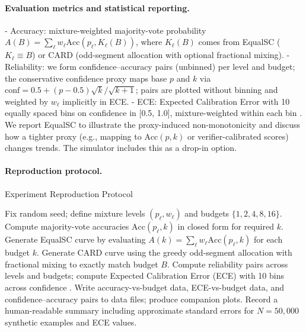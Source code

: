 \documentclass[11pt]{article}
\begin{document}
\paragraph{Evaluation metrics and statistical reporting.}
- Accuracy: mixture-weighted majority-vote probability $A(B)=\sum_\ell w_\ell \mathrm{Acc}(p_\ell, K_\ell(B))$, where $K_\ell(B)$ comes from EqualSC ($K_\ell\equiv B$) or CARD (odd-segment allocation with optional fractional mixing).
- Reliability: we form confidence–accuracy pairs (unbinned) per level and budget; the conservative confidence proxy maps base $p$ and $k$ via $\text{conf}=0.5+(p-0.5)\sqrt{k}/\sqrt{k+1}$; pairs are plotted without binning and weighted by $w_\ell$ implicitly in ECE.
- ECE: Expected Calibration Error with 10 equally spaced bins on confidence in [0.5, 1.0], mixture-weighted within each bin \citep{Guo2017Calibration}. We report EqualSC to illustrate the proxy-induced non-monotonicity and discuss how a tighter proxy (e.g., mapping to $\mathrm{Acc}(p,k)$ or verifier-calibrated scores) changes trends. The simulator includes this as a drop-in option.

\resultsTable
\reliabilityTable
\eceTable

\paragraph{Reproduction protocol.}
\begin{algorithm}[h]
\caption{Experiment Reproduction Protocol}
\begin{algorithmic}[1]
\STATE Fix random seed; define mixture levels $(p_\ell,w_\ell)$ and budgets $\{1,2,4,8,16\}$.
\STATE Compute majority-vote accuracies $\mathrm{Acc}(p_\ell,k)$ in closed form for required $k$.
\STATE Generate EqualSC curve by evaluating $A(k)=\sum_\ell w_\ell \mathrm{Acc}(p_\ell,k)$ for each budget $k$.
\STATE Generate CARD curve using the greedy odd-segment allocation with fractional mixing to exactly match budget $B$.
\STATE Compute reliability pairs across levels and budgets; compute Expected Calibration Error (ECE) with 10 bins across confidence \citep{Guo2017Calibration}.
\STATE Write accuracy-vs-budget data, ECE-vs-budget data, and confidence–accuracy pairs to data files; produce companion plots.
\STATE Record a human-readable summary including approximate standard errors for $N=50{,}000$ synthetic examples and ECE values.
\end{algorithmic}
\end{algorithm}
\end{document}

